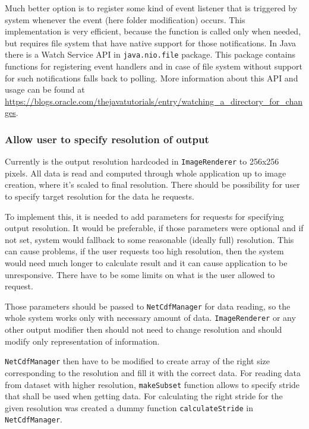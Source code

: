 \documentclass[11pt,a4paper,titlepage,oneside]{report}
\begin{document}
Much better option is to register some kind of event listener that is triggered by system whenever the event (here folder modification) occurs. This implementation is very efficient, because the function is called only when needed, but requires file system that have native support for those notifications. In Java there is a Watch Service API in \texttt{java.nio.file} package. This package contains functions for registering event handlers and in case of file system without support for such notifications falls back to polling. More information about this API and usage can be found at \url{https://blogs.oracle.com/thejavatutorials/entry/watching_a_directory_for_changes}.

\subsubsection{Allow user to specify resolution of output}
Currently is the output resolution hardcoded in \texttt{ImageRenderer} to 256x256 pixels. All data is read and computed through whole application up to image creation, where it's scaled to final resolution. There should be possibility for user to specify target resolution for the data he requests.

To implement this, it is needed to add parameters for requests for specifying output resolution. It would be preferable, if those parameters were optional and if not set, system would fallback to some reasonable (ideally full) resolution. This can cause problems, if the user requests too high resolution, then the system would need much longer to calculate result and it can cause application to be unresponsive. There have to be some limits on what is the user allowed to request.

Those parameters should be passed to \texttt{NetCdfManager} for data reading, so the whole system works only with necessary amount of data. \texttt{ImageRenderer} or any other output modifier then should not need to change resolution and should modify only representation of information.

\texttt{NetCdfManager} then have to be modified to create array of the right size corresponding to the resolution and fill it with the correct data. For reading data from dataset with higher resolution, \texttt{makeSubset} function allows to specify stride that shall be used when getting data. For calculating the right stride for the given resolution was created a dummy function \texttt{calculateStride} in \texttt{NetCdfManager}.
\end{document}
